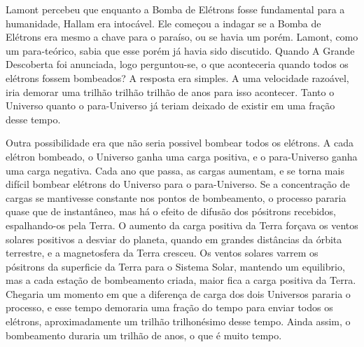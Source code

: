 \documentclass[14pt,portuguese]{extreport}
\begin{document}
    	  Lamont percebeu que enquanto a Bomba de Elétrons fosse fundamental para a humanidade, Hallam era intocável. Ele começou a indagar se a Bomba de Elétrons era mesmo a chave para o paraíso, ou se havia um porém. Lamont, como um para-teórico, sabia que esse porém já havia sido discutido. Quando A Grande Descoberta foi anunciada, logo perguntou-se, o que aconteceria quando todos os elétrons fossem bombeados? A resposta era simples. A uma velocidade razoável, iria demorar uma trilhão trilhão trilhão de anos para isso acontecer. Tanto o Universo quanto o para-Universo já teriam deixado de existir em uma fração desse tempo.
    	  
    	  Outra possibilidade era que não seria possivel bombear todos os elétrons. A cada elétron bombeado, o Universo ganha uma carga positiva, e o para-Universo ganha uma carga negativa. Cada ano que passa, as cargas aumentam, e se torna mais difícil bombear elétrons do Universo para o para-Universo. Se a concentração de cargas se mantivesse constante nos pontos de bombeamento, o processo pararia quase que de instantâneo, mas há o efeito de difusão dos pósitrons recebidos, espalhando-os pela Terra. O aumento da carga positiva da Terra forçava os ventos solares positivos a desviar do planeta, quando em grandes distâncias da órbita terrestre, e a magnetosfera da Terra cresceu. Os ventos solares varrem os pósitrons da superficie da Terra para o Sistema Solar, mantendo um equilibrio, mas a cada estação de bombeamento criada, maior fica a carga positiva da Terra. Chegaria um momento em que a diferença de carga dos dois Universos pararia o processo, e esse tempo demoraria uma fração do tempo para enviar todos os elétrons, aproximadamente um trilhão trilhonésimo desse tempo. Ainda assim, o bombeamento duraria um trilhão de anos, o que é muito tempo.
    	  
    	  
\end{document}
